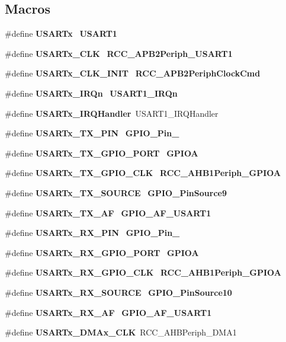 \subsection*{Macros}
\begin{DoxyCompactItemize}
\item 
\#define \textbf{ U\+S\+A\+R\+Tx}~\textbf{ U\+S\+A\+R\+T1}
\item 
\#define \textbf{ U\+S\+A\+R\+Tx\+\_\+\+C\+LK}~\textbf{ R\+C\+C\+\_\+\+A\+P\+B2\+Periph\+\_\+\+U\+S\+A\+R\+T1}
\item 
\#define \textbf{ U\+S\+A\+R\+Tx\+\_\+\+C\+L\+K\+\_\+\+I\+N\+IT}~\textbf{ R\+C\+C\+\_\+\+A\+P\+B2\+Periph\+Clock\+Cmd}
\item 
\#define \textbf{ U\+S\+A\+R\+Tx\+\_\+\+I\+R\+Qn}~\textbf{ U\+S\+A\+R\+T1\+\_\+\+I\+R\+Qn}
\item 
\#define \textbf{ U\+S\+A\+R\+Tx\+\_\+\+I\+R\+Q\+Handler}~U\+S\+A\+R\+T1\+\_\+\+I\+R\+Q\+Handler
\item 
\#define \textbf{ U\+S\+A\+R\+Tx\+\_\+\+T\+X\+\_\+\+P\+IN}~\textbf{ G\+P\+I\+O\+\_\+\+Pin\+\_}
\item 
\#define \textbf{ U\+S\+A\+R\+Tx\+\_\+\+T\+X\+\_\+\+G\+P\+I\+O\+\_\+\+P\+O\+RT}~\textbf{ G\+P\+I\+OA}
\item 
\#define \textbf{ U\+S\+A\+R\+Tx\+\_\+\+T\+X\+\_\+\+G\+P\+I\+O\+\_\+\+C\+LK}~\textbf{ R\+C\+C\+\_\+\+A\+H\+B1\+Periph\+\_\+\+G\+P\+I\+OA}
\item 
\#define \textbf{ U\+S\+A\+R\+Tx\+\_\+\+T\+X\+\_\+\+S\+O\+U\+R\+CE}~\textbf{ G\+P\+I\+O\+\_\+\+Pin\+Source9}
\item 
\#define \textbf{ U\+S\+A\+R\+Tx\+\_\+\+T\+X\+\_\+\+AF}~\textbf{ G\+P\+I\+O\+\_\+\+A\+F\+\_\+\+U\+S\+A\+R\+T1}
\item 
\#define \textbf{ U\+S\+A\+R\+Tx\+\_\+\+R\+X\+\_\+\+P\+IN}~\textbf{ G\+P\+I\+O\+\_\+\+Pin\+\_}
\item 
\#define \textbf{ U\+S\+A\+R\+Tx\+\_\+\+R\+X\+\_\+\+G\+P\+I\+O\+\_\+\+P\+O\+RT}~\textbf{ G\+P\+I\+OA}
\item 
\#define \textbf{ U\+S\+A\+R\+Tx\+\_\+\+R\+X\+\_\+\+G\+P\+I\+O\+\_\+\+C\+LK}~\textbf{ R\+C\+C\+\_\+\+A\+H\+B1\+Periph\+\_\+\+G\+P\+I\+OA}
\item 
\#define \textbf{ U\+S\+A\+R\+Tx\+\_\+\+R\+X\+\_\+\+S\+O\+U\+R\+CE}~\textbf{ G\+P\+I\+O\+\_\+\+Pin\+Source10}
\item 
\#define \textbf{ U\+S\+A\+R\+Tx\+\_\+\+R\+X\+\_\+\+AF}~\textbf{ G\+P\+I\+O\+\_\+\+A\+F\+\_\+\+U\+S\+A\+R\+T1}
\item 
\#define \textbf{ U\+S\+A\+R\+Tx\+\_\+\+D\+M\+Ax\+\_\+\+C\+LK}~R\+C\+C\+\_\+\+A\+H\+B\+Periph\+\_\+\+D\+M\+A1
\end{DoxyCompactItemize}
